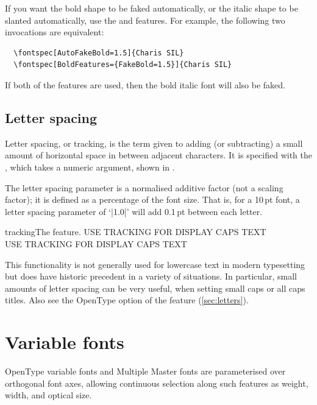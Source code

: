 \documentclass[a4paper]{l3doc}
\begin{document}
If you want the bold shape to be faked automatically, or the italic shape
to be slanted automatically, use the  and
 features. For example, the following two invocations
are equivalent:
\begin{Verbatim}
  \fontspec[AutoFakeBold=1.5]{Charis SIL}
  \fontspec[BoldFeatures={FakeBold=1.5}]{Charis SIL}
\end{Verbatim}
If both of the  features are used, then the bold italic
font will also be faked.

\subsection{Letter spacing}
Letter spacing, or tracking, is the term given to adding (or subtracting) a small amount of horizontal space in between adjacent characters. It is specified with the , which takes a numeric argument,
shown in .

The letter spacing parameter is a normalised additive factor (not a scaling factor); it is defined as a percentage of the font size. That is, for a 10\,pt font, a letter spacing parameter of `|1.0|' will add 0.1\,pt between each letter.

\begin{Xexample}{tracking}{The  feature.}
  \setmainfont{Ysabeau-Light.otf}
  USE TRACKING FOR DISPLAY CAPS TEXT \\
  USE TRACKING FOR DISPLAY CAPS TEXT
\end{Xexample}

This functionality is not generally used for lowercase text in modern typesetting but does have historic precedent in a variety of situations.
In particular, small amounts of letter spacing can be very useful, when setting small caps or all caps titles.
Also see the OpenType  option of the  feature (\vref{sec:letters}).


\section{Variable fonts} \label{sec:variable}

OpenType variable fonts and Multiple Master fonts are parameterised over
orthogonal font axes, allowing continuous selection along such features
as weight, width, and optical size.
\end{document}
